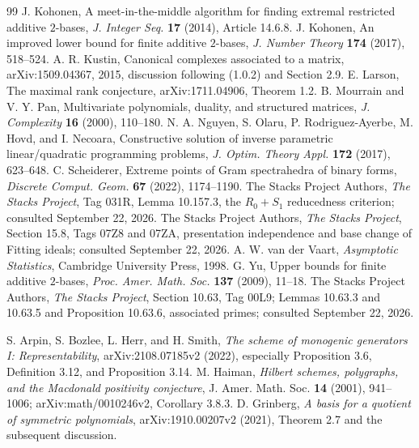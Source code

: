 \begin{thebibliography}{99}
 J. Kohonen, A meet-in-the-middle algorithm for finding extremal restricted additive $2$-bases, \emph{J. Integer Seq.} \textbf{17} (2014), Article 14.6.8.
 J. Kohonen, An improved lower bound for finite additive $2$-bases, \emph{J. Number Theory} \textbf{174} (2017), 518--524.
 A. R. Kustin, Canonical complexes associated to a matrix, arXiv:1509.04367, 2015, discussion following (1.0.2) and Section 2.9.
 E. Larson, The maximal rank conjecture, arXiv:1711.04906, Theorem 1.2.
 B. Mourrain and V. Y. Pan, Multivariate polynomials, duality, and structured matrices, \emph{J. Complexity} \textbf{16} (2000), 110--180.
 N. A. Nguyen, S. Olaru, P. Rodriguez-Ayerbe, M. Hovd, and I. Necoara, Constructive solution of inverse parametric linear/quadratic programming problems, \emph{J. Optim. Theory Appl.} \textbf{172} (2017), 623--648.
 C. Scheiderer, Extreme points of Gram spectrahedra of binary forms, \emph{Discrete Comput. Geom.} \textbf{67} (2022), 1174--1190.
 The Stacks Project Authors, \emph{The Stacks Project}, Tag 031R, Lemma 10.157.3, the $R_0+S_1$ reducedness criterion; consulted September 22, 2026.
 The Stacks Project Authors, \emph{The Stacks Project}, Section 15.8, Tags 07Z8 and 07ZA, presentation independence and base change of Fitting ideals; consulted September 22, 2026.
 A. W. van der Vaart, \emph{Asymptotic Statistics}, Cambridge University Press, 1998.
 G. Yu, Upper bounds for finite additive $2$-bases, \emph{Proc. Amer. Math. Soc.} \textbf{137} (2009), 11--18.
 The Stacks Project Authors, \emph{The Stacks Project}, Section 10.63, Tag 00L9; Lemmas 10.63.3 and 10.63.5 and Proposition 10.63.6, associated primes; consulted September 22, 2026.

 S. Arpin, S. Bozlee, L. Herr, and H. Smith,
\emph{The scheme of monogenic generators I: Representability},
arXiv:2108.07185v2 (2022), especially Proposition 3.6, Definition 3.12,
and Proposition 3.14.
 M. Haiman,
\emph{Hilbert schemes, polygraphs, and the Macdonald positivity conjecture},
J. Amer. Math. Soc. \textbf{14} (2001), 941--1006;
arXiv:math/0010246v2, Corollary 3.8.3.
 D. Grinberg,
\emph{A basis for a quotient of symmetric polynomials},
arXiv:1910.00207v2 (2021), Theorem 2.7 and the subsequent discussion.
\end{thebibliography}

